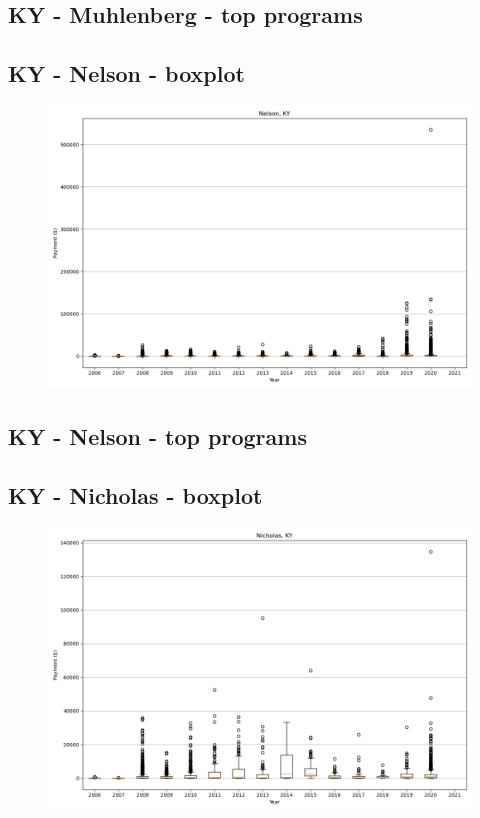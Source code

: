 \subsection*{KY - Muhlenberg - top programs}

\newpage
\subsection*{KY - Nelson - boxplot}
\begin{figure}[h]
\centering
\includegraphics[width=7in]{../output/boxplots/counties/Nelson-KY_boxplot.png}
\end{figure}


\subsection*{KY - Nelson - top programs}

\newpage
\subsection*{KY - Nicholas - boxplot}
\begin{figure}[h]
\centering
\includegraphics[width=7in]{../output/boxplots/counties/Nicholas-KY_boxplot.png}
\end{figure}


